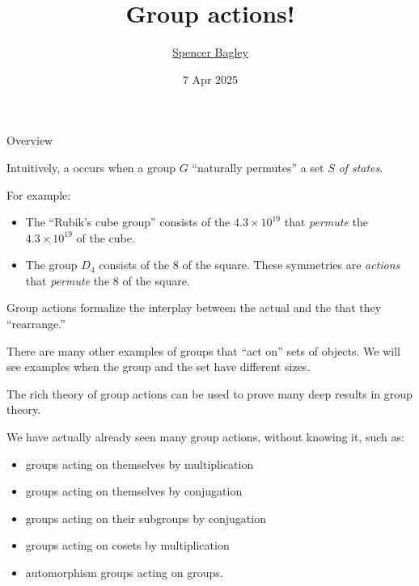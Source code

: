 \documentclass[8pt,handout]{beamer}
\title[Group actions!]{Group actions!}
\author[\href{mailto:sbagley@westminsteru.edu}{S. Bagley}]
       {\href{mailto:sbagley@westminsteru.edu}{Spencer Bagley}}
\institute[Westminster] { 
  \normalsize With many thanks to Matthew Macauley, \\
  \url{http://www.math.clemson.edu/~macaule/}}
\date[7 Apr 2025]{7 Apr 2025}
\newcommand{\Pause}{}      %
\begin{document}
\frame{\titlepage}





\begin{frame}{Overview} %

  Intuitively, a  occurs when a group $G$
  ``naturally permutes'' a set $S$ \emph{of states}.

  \medskip\Pause
  
  For example: \smallskip
  \begin{itemize}
  \item The ``Rubik's cube group'' consists of the $4.3\times 10^{19}$
     that \emph{permute} the
    $4.3\times 10^{19}$  of the cube. \Pause
  \item The group $D_4$ consists of the 8  of the
    square. These symmetries are \emph{actions} that
    \emph{permute} the $8$  of the
    square.
  \end{itemize}
  
  \medskip\Pause 
  
  Group actions formalize the interplay between the actual
   and the  that they
  ``rearrange.''
  
  \medskip\Pause
  
  There are many other examples of groups that ``act on'' sets of
  objects. We will see examples when the group and the set have
  different sizes.
  
  \medskip\pause

  The rich theory of group actions can be used to prove many deep
  results in group theory.

  \medskip\Pause

  We have actually already seen many group actions, without knowing
  it, such as: \smallskip
  \begin{itemize}
  \item groups acting on themselves by multiplication
  \item groups acting on themselves by conjugation
  \item groups acting on their subgroups by conjugation
  \item groups acting on cosets by multiplication
  \item automorphism groups acting on groups.
  \end{itemize}
  
\end{frame}
\end{document}
